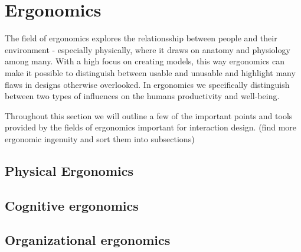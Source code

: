 \section{Ergonomics} \label{sec:ergonomics} 
The field of ergonomics explores the relationsship between people and their environment - especially physically, where it draws on anatomy and physiology among many.  With a high focus on creating models, this way ergonomics can make it possible to distinguish between usable and unusable and highlight many flaws in designs otherwise overlooked. In ergonomics we specifically distinguish between two types of influences on the humans productivity and well-being.




Throughout this section we will outline a few of the important points and tools provided by the fields of ergonomics important for interaction design. (\todo find more ergonomic ingenuity and sort them into subsections)

\subsection{Physical Ergonomics}



\subsection{Cognitive ergonomics}

\subsection{Organizational ergonomics}



